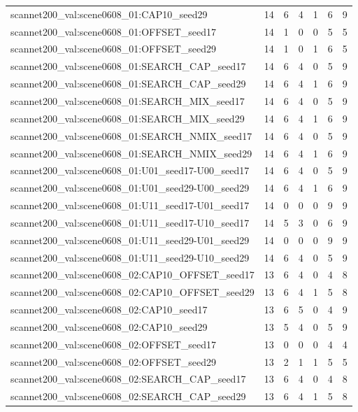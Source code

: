 \begin{table}[t]
\begin{tabular}{lrrrrrr}
scannet200\_val:scene0608\_01:CAP10\_seed29 & 14 & 6 & 4 & 1 & 6 & 9 \\
scannet200\_val:scene0608\_01:OFFSET\_seed17 & 14 & 1 & 0 & 0 & 5 & 5 \\
scannet200\_val:scene0608\_01:OFFSET\_seed29 & 14 & 1 & 0 & 1 & 6 & 5 \\
scannet200\_val:scene0608\_01:SEARCH\_CAP\_seed17 & 14 & 6 & 4 & 0 & 5 & 9 \\
scannet200\_val:scene0608\_01:SEARCH\_CAP\_seed29 & 14 & 6 & 4 & 1 & 6 & 9 \\
scannet200\_val:scene0608\_01:SEARCH\_MIX\_seed17 & 14 & 6 & 4 & 0 & 5 & 9 \\
scannet200\_val:scene0608\_01:SEARCH\_MIX\_seed29 & 14 & 6 & 4 & 1 & 6 & 9 \\
scannet200\_val:scene0608\_01:SEARCH\_NMIX\_seed17 & 14 & 6 & 4 & 0 & 5 & 9 \\
scannet200\_val:scene0608\_01:SEARCH\_NMIX\_seed29 & 14 & 6 & 4 & 1 & 6 & 9 \\
scannet200\_val:scene0608\_01:U01\_seed17-U00\_seed17 & 14 & 6 & 4 & 0 & 5 & 9 \\
scannet200\_val:scene0608\_01:U01\_seed29-U00\_seed29 & 14 & 6 & 4 & 1 & 6 & 9 \\
scannet200\_val:scene0608\_01:U11\_seed17-U01\_seed17 & 14 & 0 & 0 & 0 & 9 & 9 \\
scannet200\_val:scene0608\_01:U11\_seed17-U10\_seed17 & 14 & 5 & 3 & 0 & 6 & 9 \\
scannet200\_val:scene0608\_01:U11\_seed29-U01\_seed29 & 14 & 0 & 0 & 0 & 9 & 9 \\
scannet200\_val:scene0608\_01:U11\_seed29-U10\_seed29 & 14 & 6 & 4 & 0 & 5 & 9 \\
scannet200\_val:scene0608\_02:CAP10\_OFFSET\_seed17 & 13 & 6 & 4 & 0 & 4 & 8 \\
scannet200\_val:scene0608\_02:CAP10\_OFFSET\_seed29 & 13 & 6 & 4 & 1 & 5 & 8 \\
scannet200\_val:scene0608\_02:CAP10\_seed17 & 13 & 6 & 5 & 0 & 4 & 9 \\
scannet200\_val:scene0608\_02:CAP10\_seed29 & 13 & 5 & 4 & 0 & 5 & 9 \\
scannet200\_val:scene0608\_02:OFFSET\_seed17 & 13 & 0 & 0 & 0 & 4 & 4 \\
scannet200\_val:scene0608\_02:OFFSET\_seed29 & 13 & 2 & 1 & 1 & 5 & 5 \\
scannet200\_val:scene0608\_02:SEARCH\_CAP\_seed17 & 13 & 6 & 4 & 0 & 4 & 8 \\
scannet200\_val:scene0608\_02:SEARCH\_CAP\_seed29 & 13 & 6 & 4 & 1 & 5 & 8 \\

\end{tabular}
\end{table}
